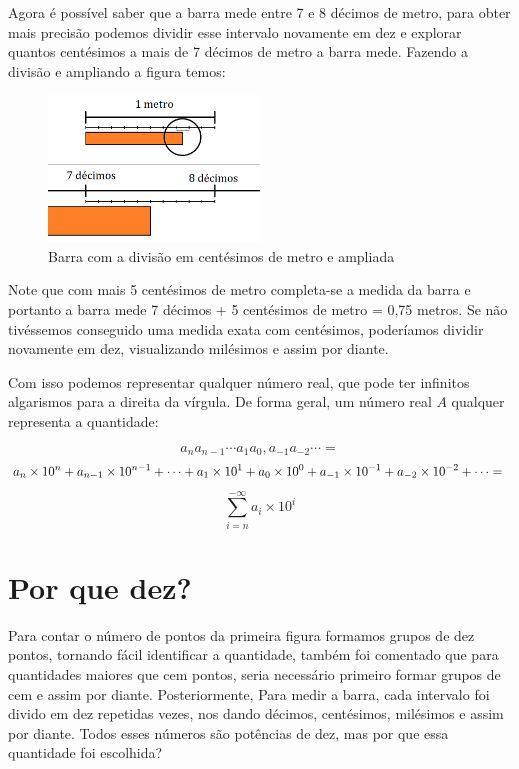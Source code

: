 \documentclass{report}
\theoremstyle{definition}
\begin{document}
Agora é possível saber que a barra mede entre 7 e 8 décimos de metro, para obter mais precisão podemos dividir esse intervalo novamente em dez e explorar quantos centésimos a mais de 7 décimos de metro a barra mede. Fazendo a divisão e ampliando a figura temos:

\begin{figure}[H]
    \centering
    \includegraphics[width=0.5\textwidth]{imgs/barra_3.png}
    \caption{Barra com a divisão em centésimos de metro e ampliada}
\end{figure}

Note que com mais 5 centésimos de metro completa-se a medida da barra e portanto a barra mede 7 décimos + 5 centésimos de metro = 0,75 metros. Se não tivéssemos conseguido uma medida exata com centésimos, poderíamos dividir novamente em dez, visualizando milésimos e assim por diante.

Com isso podemos representar qualquer número real, que pode ter infinitos algarismos para a direita da vírgula. De forma geral, um número real $A$ qualquer representa a quantidade:

\begin{equation*}
a_n a_{n-1} \cdots a_1 a_0 , a_{-1} a_{-2} \cdots =
\end{equation*}
\begin{equation*}
a_{n} \times 10^{n} + a_{n-1} \times 10^{n-1} + \cdots + a_{1} \times 10^1 + a_{0} \times 10^0 + a_{-1} \times 10^{-1} + a_{-2} \times 10^{-2} + \cdots= \notag\\
\end{equation*}
\begin{equation}
\sum_{i=n}^{-\infty}a_i \times 10^i
\end{equation}

\section{Por que dez?}

Para contar o número de pontos da primeira figura formamos grupos de dez pontos, tornando fácil identificar a quantidade, também foi comentado que para quantidades maiores que cem pontos, seria necessário primeiro formar grupos de cem e assim por diante. Posteriormente, Para medir a barra, cada intervalo foi divido em dez repetidas vezes, nos dando décimos, centésimos, milésimos e assim por diante. Todos esses números são potências de dez, mas por que essa quantidade foi escolhida?
\end{document}
